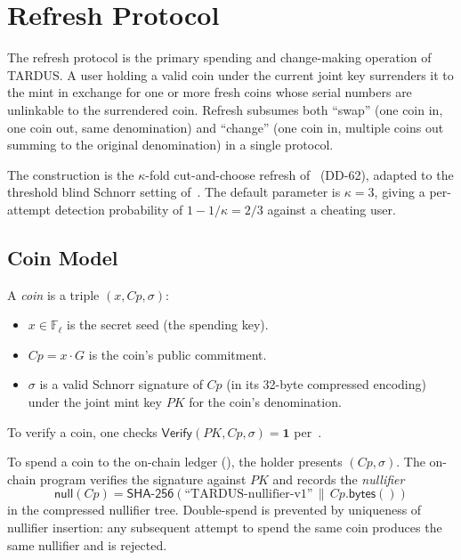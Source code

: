 \section{Refresh Protocol}
\label{sec:refresh}

The refresh protocol is the primary spending and change-making operation of TARDUS. A user holding a valid coin under the current joint key surrenders it to the mint in exchange for one or more fresh coins whose serial numbers are unlinkable to the surrendered coin. Refresh subsumes both ``swap'' (one coin in, one coin out, same denomination) and ``change'' (one coin in, multiple coins out summing to the original denomination) in a single protocol.

The construction is the $\kappa$-fold cut-and-choose refresh of~\cite{dold2019} (DD-62), adapted to the threshold blind Schnorr setting of~. The default parameter is $\kappa = 3$, giving a per-attempt detection probability of $1 - 1/\kappa = 2/3$ against a cheating user.

\subsection{Coin Model}
\label{sec:refresh-coin}

A \emph{coin} is a triple $(x, Cp, \sigma)$:
\begin{itemize}[leftmargin=2em,itemsep=0pt]
  \item $x \in \mathbb{F}_\ell$ is the secret seed (the spending key).
  \item $Cp = x \cdot G$ is the coin's public commitment.
  \item $\sigma$ is a valid Schnorr signature of $Cp$ (in its 32-byte compressed encoding) under the joint mint key $PK$ for the coin's denomination.
\end{itemize}

To verify a coin, one checks $\mathsf{Verify}(PK, Cp, \sigma) = \mathbf{1}$ per~.

To spend a coin to the on-chain ledger (), the holder presents $(Cp, \sigma)$. The on-chain program verifies the signature against $PK$ and records the \emph{nullifier}
\[
  \mathsf{null}(Cp) = \mathsf{SHA\text{-}256}(\text{``TARDUS-nullifier-v1''} \,\|\, Cp.\mathsf{bytes}())
\]
in the compressed nullifier tree. Double-spend is prevented by uniqueness of nullifier insertion: any subsequent attempt to spend the same coin produces the same nullifier and is rejected.


